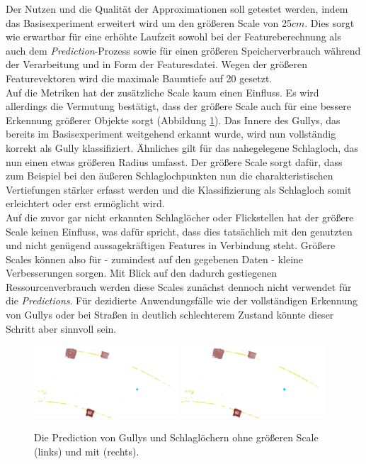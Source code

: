 Der Nutzen und die Qualität der Approximationen soll getestet werden, indem das Basisexperiment erweitert wird um den größeren Scale von 25$cm$. Dies sorgt wie erwartbar für eine erhöhte Laufzeit sowohl bei der Featureberechnung als auch dem \textit{Prediction}-Prozess sowie für einen größeren Speicherverbrauch während der Verarbeitung und in Form der Featuresdatei. Wegen der größeren Featurevektoren wird die maximale Baumtiefe auf 20 gesetzt. \\
Auf die Metriken hat der zusätzliche Scale kaum einen Einfluss. Es wird allerdings die Vermutung bestätigt, dass der größere Scale auch für eine bessere Erkennung größerer Objekte sorgt (Abbildung \ref{fig:cmp_bigger_scale}). Das Innere des Gullys, das bereits im Basisexperiment weitgehend erkannt wurde, wird nun vollständig korrekt als Gully klassifiziert. Ähnliches gilt für das nahegelegene Schlagloch, das nun einen etwas größeren Radius umfasst. Der größere Scale sorgt dafür, dass zum Beispiel bei den äußeren Schlaglochpunkten nun die charakteristischen Vertiefungen stärker erfasst werden und die Klassifizierung als Schlagloch somit erleichtert oder erst ermöglicht wird. \\
Auf die zuvor gar nicht erkannten Schlaglöcher oder Flickstellen hat der größere Scale keinen Einfluss, was dafür spricht, dass dies tatsächlich mit den genutzten und nicht genügend aussagekräftigen Features in Verbindung steht. Größere Scales können also für - zumindest auf den gegebenen Daten - kleine Verbesserungen sorgen. Mit Blick auf den dadurch gestiegenen Ressourcenverbrauch werden diese Scales zunächst dennoch nicht verwendet für die \textit{Predictions}. Für dezidierte Anwendungsfälle wie der vollständigen Erkennung von Gullys oder bei Straßen in deutlich schlechterem Zustand könnte dieser Schritt aber sinnvoll sein.

\begin{figure}
    {\includegraphics[width=0.48\textwidth]{graphics/eval_gully_pothole_prediction}}
    {\includegraphics[width=0.48\textwidth]{graphics/eval_gully_pothole_bigger_scale}}
    \caption{Die Prediction von Gullys und Schlaglöchern ohne größeren Scale (links) und mit (rechts).}
    \label{fig:cmp_bigger_scale}
\end{figure}

